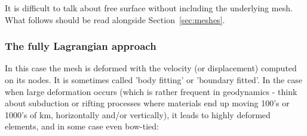 \begin{remark} It is difficult to talk about free surface without including the underlying mesh. What follows
should be read alongside Section~\ref{sec:meshes}.
\end{remark}

\subsubsection{The fully Lagrangian approach}


In this case the mesh is deformed with the velocity (or displacement) computed on its nodes. 
It is sometimes called 'body fitting' \cite{crsg12} or 'boundary fitted'. 
In the case when large deformation occurs (which is rather frequent in geodynamics - 
think about subduction or rifting processes where materials end up moving 100's or 1000's of km, horizontally
and/or vertically), it leads to highly deformed elements, and in some case even bow-tied:

